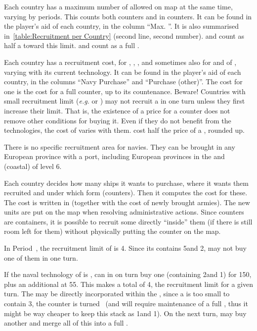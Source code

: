 \bparag Each country has a maximum number of \ND allowed on map at the same
time, varying by periods. This counts both \ND counters and \ND in \FLEET
counters.
\bparag It can be found in the player's aid of each country, in the column
``Max. \ND''.
\bparag It is also summarised in~\ref{table:Recruitment per Country} (second
line, second number).
\bparag \NGD and \NDE count as half a \ND toward this limit. \NTD and \VGD
count as a full \ND.

\aparag[Costs]
\bparag Each country has a recruitment cost, for \NWD, \NTD, \FLEET\Facemoins,
and sometimes also for \NGD and \FLEET\Facemoins of \NGD, varying with its
current technology.
\bparag It can be found in the player's aid of each country, in the columns
``Navy Purchase'' and ``Purchase (other)''.
\bparag The cost for one \FLEET\Facemoins is the cost for a full counter, up
to its countenance.
\bparag Beware! Countries with small recruitment limit (\emph{e.g.} \POL or
\RUS) may not recruit a \FLEET\Facemoins in one turn unless they first
increase their limit. That is, the existence of a price for a counter does not
remove other conditions for buying it.
\bparag Even if they do not benefit from the technologies, the cost of \NGD
varies with them.
\bparag \NDE cost half the price of a \ND, rounded up.

 There is no specific recruitment area for
navies. They can be brought in any European province with a port, including
European provinces in the \ROTW and (coastal) \COL of level 6.

\aparag[Recruitment.] Each country decides how many ships it wants to
purchase, where it wants them recruited and under which form (counters). Then
it computes the cost for these.
\bparag The cost is written in  (together with the
cost of newly brought armies).
\bparag The new units are put on the map when resolving administrative
actions.
\bparag Since \FLEET counters are containers, it is possible to recruit some
\ND directly ``inside'' them (if there is still room left for them) without
physically putting the \ND counter on the map.

\begin{exemple}
  In Period~, the recruitment limit of \SUE is 4\ND. Since its
  \FLEET\Faceplus contains 5\ND and 2\NTD, \SUE may not buy one of them in one
  turn.

  If the naval technology of \SUE is \TBAT, \SUE can in on turn buy one
  \FLEET\Facemoins (containing 2\ND and 1\NTD) for 150\ducats, plus an
  additional \NWD at 55\ducats. This makes a total of 4\ND, the recruitment
  limit for a given turn. The \NWD may be directly incorporated within the
  \FLEET, since a \FLEET\Facemoins is too small to contain 3\ND, the counter
  is turned ~\faceplus (and will require maintenance of a full
  \FLEET\Faceplus, thus it might be way cheaper to keep this stack as
  1\FLEET\Facemoins and 1\ND). On the next turn, \SUE may buy another
  \FLEET\Facemoins and merge all of this into a full \FLEET\Faceplus.
\end{exemple}

